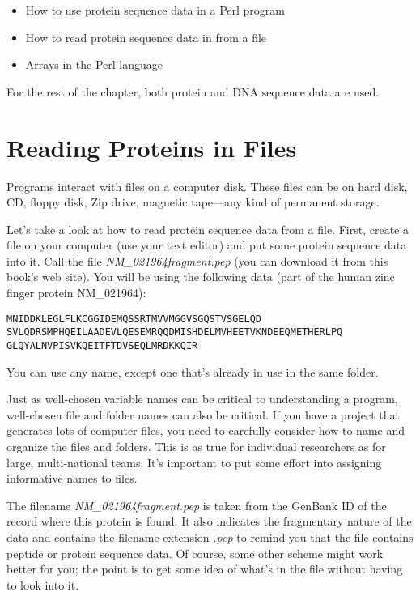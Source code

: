 \begin{itemize}
  \item How to use protein sequence data in a Perl program
  \item How to read protein sequence data in from a file
  \item Arrays in the Perl language
\end{itemize}

For the rest of the chapter, both protein and DNA sequence data are used. 

\section{Reading Proteins in Files}
Programs interact with files on a computer disk. These files can be on hard disk, CD, floppy disk, Zip drive, magnetic tape—any kind of permanent storage.

Let's take a look at how to read protein sequence data from a file. First, create a file on your computer (use your text editor) and put some protein sequence data into it. Call the file \textit{NM\_021964fragment.pep} (you can download it from this book's web site). You will be using the following data (part of the human zinc finger protein NM\_021964):

\begin{verbatim}
MNIDDKLEGLFLKCGGIDEMQSSRTMVVMGGVSGQSTVSGELQD
SVLQDRSMPHQEILAADEVLQESEMRQQDMISHDELMVHEETVKNDEEQMETHERLPQ
GLQYALNVPISVKQEITFTDVSEQLMRDKKQIR
\end{verbatim}

You can use any name, except one that's already in use in the same folder.

Just as well-chosen variable names can be critical to understanding a program, well-chosen file and folder names can also be critical. If you have a project that generates lots of computer files, you need to carefully consider how to name and organize the files and folders. This is as true for individual researchers as for large, multi-national teams. It's important to put some effort into assigning informative names to files.

The filename \textit{NM\_021964fragment.pep} is taken from the GenBank ID of the record where this protein is found. It also indicates the fragmentary nature of the data and contains the filename extension \textit{.pep} to remind you that the file contains peptide or protein sequence data. Of course, some other scheme might work better for you; the point is to get some idea of what's in the file without having to look into it.

